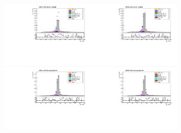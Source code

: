\begin{figure}[htb]
  \begin{center}
    \includegraphics[width=0.40\textwidth]{../figs/figs_v11/ELECTRON_WGamma/PrepareYields/c_TotalDATAvsMC_Barrel__Mpholep1PRELIMINARY_FOR_E_TO_GAMMA_WITH_PSV_CUT_pt35to45_.pdf}\includegraphics[width=0.40\textwidth]{../figs/figs_v11/ELECTRON_WGamma/PrepareYields/c_TotalDATAvsMC_Barrel__Mpholep1PRELIMINARY_FOR_E_TO_GAMMA_WITH_PSV_CUT_pt35to45__etogScale.pdf}\\
    \includegraphics[width=0.40\textwidth]{../figs/figs_v11/ELECTRON_WGamma/PrepareYields/c_TotalDATAvsMC_Endcap__Mpholep1PRELIMINARY_FOR_E_TO_GAMMA_WITH_PSV_CUT_pt35to45_.pdf}\includegraphics[width=0.40\textwidth]{../figs/figs_v11/ELECTRON_WGamma/PrepareYields/c_TotalDATAvsMC_Endcap__Mpholep1PRELIMINARY_FOR_E_TO_GAMMA_WITH_PSV_CUT_pt35to45__etogScale.pdf}\\

\end{center}
\end{figure}
